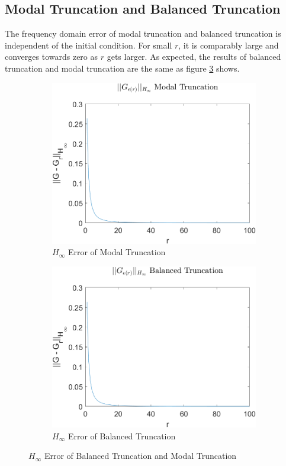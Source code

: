 \subsection{Modal Truncation and Balanced Truncation}
The frequency domain error of modal truncation and balanced truncation is independent of the initial condition.
For small \(r\), it is comparably large and converges towards zero as \(r\) gets larger.
As expected, the results of balanced truncation and modal truncation are the same as figure \ref{FIG-H-BTMT} shows.
\begin{figure}[H]
\begin{subfigure}[b]{0.5\textwidth}
\centering
\includegraphics[width=\textwidth]{images/freq/H_MT}
\caption{$H_{\infty}$ Error of Modal Truncation}
\label{FIG-H-MT}
\end{subfigure}
\begin{subfigure}[b]{0.5\textwidth}
\centering
\includegraphics[width=\textwidth]{images/freq/H_BT}
\caption{$H_{\infty}$ Error of Balanced Truncation}
\label{FIG-H-BT}
\end{subfigure}
\caption{$H_{\infty}$ Error of Balanced Truncation and Modal Truncation}
\label{FIG-H-BTMT}
\end{figure}


